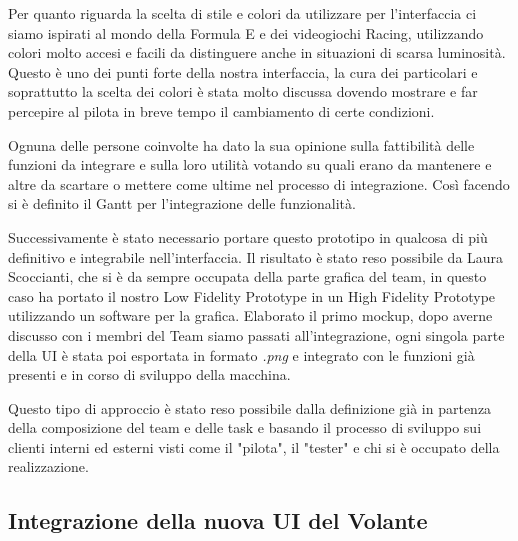 Per quanto riguarda la scelta di stile e colori da utilizzare per l'interfaccia ci siamo ispirati al mondo della Formula E
e dei videogiochi Racing, utilizzando colori molto accesi e facili da distinguere anche in situazioni di scarsa luminosità.
Questo è uno dei punti forte della nostra interfaccia, la cura dei particolari e soprattutto la scelta dei colori è 
stata molto discussa dovendo mostrare e far percepire al pilota in breve tempo il cambiamento di certe condizioni.  

Ognuna delle persone coinvolte ha dato la sua opinione sulla fattibilità delle funzioni da integrare e sulla loro utilità
votando su quali erano da mantenere e altre da scartare o mettere come ultime nel processo di integrazione.
Così facendo si è definito il Gantt per l'integrazione delle funzionalità. 

Successivamente è stato necessario portare questo prototipo in qualcosa di più definitivo e integrabile nell'interfaccia.
Il risultato è stato reso possibile da Laura Scoccianti, che si è da sempre occupata della parte grafica del team, in questo caso 
ha portato il nostro Low Fidelity Prototype in un High Fidelity Prototype utilizzando un software per la grafica.
Elaborato il primo mockup, dopo averne discusso con i membri del Team siamo passati all'integrazione, ogni singola parte della UI
è stata poi esportata in formato \emph{.png} e integrato con le funzioni già presenti e in corso di sviluppo della macchina. 

Questo tipo di approccio è stato reso possibile dalla definizione già in partenza della composizione del team e delle task
e basando il processo di sviluppo sui clienti interni ed esterni visti come il "pilota", il "tester" e chi si è occupato della realizzazione.

\subsection{Integrazione della nuova UI del Volante}


